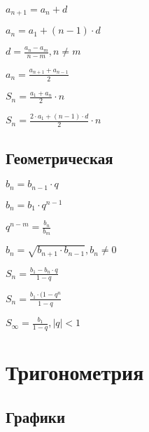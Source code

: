$ a_{n+1} = a_n + d $

$ a_n = a_1 + (n-1)\cdot d $

$ d = \frac{a_n-a_m}{n-m}, n \neq m $

$ a_n = \frac{a_{n+1} + a_{n-1}}{2} $

$ S_n = \frac{a_1 + a_n}{2}\cdot n $

$ S_n = \frac{2\cdot a_1 + (n-1)\cdot d}{2}\cdot n $

\subsection{Геометрическая}

$ b_n = b_{n-1}\cdot q $

$ b_n = b_1 \cdot q^{n-1} $

$ q^{n-m} = \frac{b_n}{b_m} $

$ b_n = \sqrt{b_{n+1}\cdot b_{n-1}}, b_n \neq 0 $

$ S_n = \frac{b_1 - b_n\cdot q}{1-q} $

$ S_n = \frac{b_1\cdot (1 - q^n}{1-q} $

$ S_\infty = \frac{b_1}{1-q}, \left|q\right| < 1 $


\section{Тригонометрия}

\subsection{Графики}

